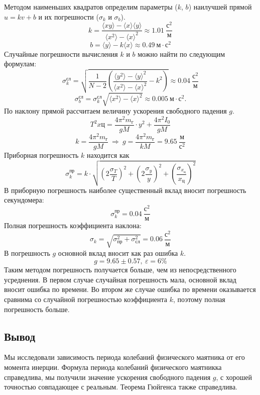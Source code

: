 \documentclass[12pt]{article}
\begin{document}
\begin{enumerate}[label={\textbf{\arabic*.}}]
		Методом наименьших квадратов определим параметры ($k$, $b$) наилучшей прямой $u = kv + b$ и их погрешности ($\sigma_k$ и $\sigma_b$). 
		$$
		k=\frac{\langle xy\rangle-\langle x\rangle \langle y\rangle}{\langle x^2\rangle - \langle x\rangle^2}\approx 1.01~\frac{\text{с}^2}{\text{м}}
		$$
		$$
		b=\langle y \rangle -k\langle x \rangle\approx 0.49~\text{м}\cdot\text{с}^2
		$$
		Случайные погрешности вычисления $k$ и $b$ можно найти по следующим формулам:
		$$
		\sigma_k^\text{сл}=\sqrt{\frac{1}{N-2}\left(\frac{\langle y^2 \rangle - \langle y \rangle^2}{\langle x^2 \rangle - \langle x \rangle^2} - k^2 \right) } \approx 0.04~\frac{\text{с}^2}{\text{м}}
		$$
		$$
		\sigma_b^\text{сл}= \sigma_k^\text{сл} \sqrt{\langle x^2 \rangle - \langle x \rangle^2} \approx 0.005~\text{м}\cdot\text{с}^2.
		$$
		По наклону прямой рассчитаем величину ускорения свободного падения $g$.
		$$
		T^2x{\text{ц}} = \frac{4\pi^2m_{\text{г}}}{gM}\cdot y^2 + \frac{4\pi^2I_0}{gM} 
		$$
		$$
		k = \frac{4\pi^2m_{\text{г}}}{gM}~\Rightarrow~g = \frac{4\pi^2m_{\text{г}}}{kM} = 9.65~\frac{\text{м}}{\text{с}^2}
		$$
		Приборная погрешность $k$ находится как
		$$
		\sigma_k^\text{пр} = k\cdot\sqrt{\left(2\frac{\sigma_T}{T}\right)^2 + \left(2\frac{\sigma_y}{y}\right)^2 + \left(\frac{\sigma_{x_{\text{ц}}}}{x_{\text{ц}}}\right)^2} 
		$$
		В приборную погрешность наиболее существенный вклад вносит погрешность секундомера:
		$$
		\sigma_k^\text{пр} = 0.04~\frac{\text{с}^2}{\text{м}}
		$$
		Полная погрешность коэффициента наклона:
		$$
		\sigma_k = \sqrt{\sigma_{\text{пр}}^2 + \sigma_{\text{сл}}^2} = 0.06~\frac{\text{с}^2}{\text{м}}
		$$
		В погрешность $g$ основной вклад вносит как раз ошибка $k$. 
		$$
		g = 9.65\pm0.57,~\varepsilon = 6\%
		$$
		Таким методом погрешность получается больше, чем из непосредственного усреднения. В первом случае случайная погрешность мала, основной вклад вносит ошибка по времени. Во втором же случае ошибка по времени оказывается сравнима со случайной погрешностью коэффициента $k$, поэтому полная погрешность больше.
	\end{enumerate}
	\subsection*{Вывод}
	Мы исследовали зависимость периода колебаний физического маятника от его момента инерции. Формула периода колебаний физического маятникка справедлива, мы получили значение ускорения свободного падения $g$, с хорошей точностью совпадающее с реальным. Теорема Гюйгенса также справедлива.
\end{document}
